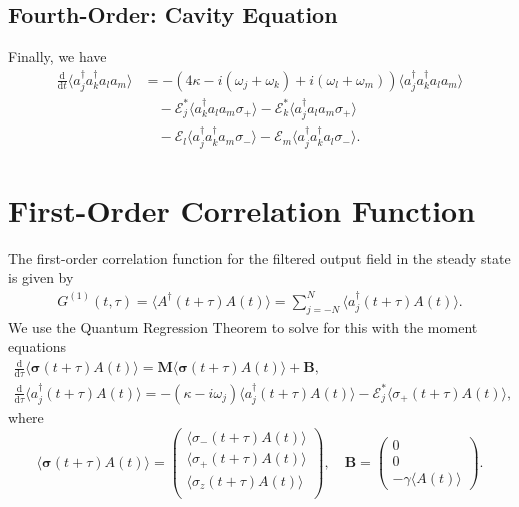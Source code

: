 \documentclass{article}
\newcommand{\ddt}[1][]{\frac{\mathrm{d} #1}{\mathrm{d}t}}
\newcommand{\ddtau}[1][]{\frac{\mathrm{d} #1}{\mathrm{d}\tau}}
\begin{document}
\subsection{Fourth-Order: Cavity Equation}

Finally, we have
\begin{align}
	\ddt \langle a^{\dagger}_{j} a^{\dagger}_{k} a_{l} a_{m} \rangle &= -\left( 4 \kappa - i \left(\omega_{j} + \omega_{k} \right) + i \left( \omega_{l} + \omega_{m} \right)\right) \langle a^{\dagger}_{j} a^{\dagger}_{k} a_{l} a_{m} \rangle \nonumber \\
	&\quad - \mathcal{E}_{j}^{*} \langle a^{\dagger}_{k} a_{l} a_{m} \sigma_{+} \rangle - \mathcal{E}_{k}^{*} \langle a^{\dagger}_{j} a_{l} a_{m} \sigma_{+} \rangle \nonumber \\
	&\quad - \mathcal{E}_{l} \langle a^{\dagger}_{j} a^{\dagger}_{k} a_{m} \sigma_{-} \rangle - \mathcal{E}_{m} \langle a^{\dagger}_{j} a^{\dagger}_{k} a_{l} \sigma_{-} \rangle.
\end{align}

\section{First-Order Correlation Function}

The first-order correlation function for the filtered output field in the steady state is given by
\begin{align}
	G^{(1)}(t, \tau) = \langle A^{\dagger}(t + \tau) A(t) \rangle = \sum_{j=-N}^{N} \langle a^{\dagger}_{j} (t + \tau) A(t) \rangle.
\end{align}
We use the Quantum Regression Theorem to solve for this with the moment equations
\begin{subequations}
	\begin{gather}
		\ddtau \langle \bm{\sigma}(t + \tau) A(t) \rangle = \bm{M} \langle \bm{\sigma}(t + \tau) A(t) \rangle + \bm{B}, \\
		\ddtau \langle a^{\dagger}_{j}(t + \tau) A(t) \rangle = -\left( \kappa - i \omega_{j} \right) \langle a^{\dagger}_{j}(t + \tau) A(t) \rangle - \mathcal{E}_{j}^{*} \langle \sigma_{+}(t + \tau) A(t) \rangle,
	\end{gather}
\end{subequations}
where
\begin{equation}
	\langle \bm{\sigma}(t + \tau) A(t) \rangle =
	\begin{pmatrix}
		\langle \sigma_{-}(t + \tau) A(t) \rangle \\
		\langle \sigma_{+}(t + \tau) A(t) \rangle \\
		\langle \sigma_{z}(t + \tau) A(t) \rangle \\
	\end{pmatrix}, \quad \bm{B} =
	\begin{pmatrix}
		0 \\
		0 \\
		-\gamma \langle A(t) \rangle
	\end{pmatrix}.
\end{equation}
\end{document}
